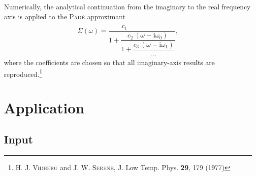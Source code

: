 \documentclass[twocolumn]{article}
\def\I{\mathrm i}
\let\vec\boldsymbol
\let\Sigma\varSigma
\let\vol\textbf
\let\name\textsc
\begin{document}
   Numerically,  the analytical  continuation  from the  imaginary  to the  real
   frequency axis is applied to the \name{Padé} approximant
   \begin{align*}
      \vec \Sigma(\omega) = \dfrac{c_1 \, \phantom{(\omega - \I \omega_0)}}
      {1 + \dfrac{c_2 \, (\omega - \I \omega_0)}
      {1 + \dfrac{c_3 \, (\omega - \I \omega_1)} \dots}},
   \end{align*}
   where  the coefficients  are chosen  so that  all imaginary-axis  results are
   reproduced.\footnote{H.  J. \name{Vidberg}  and J.  W. \name{Serene},  J. Low
   Temp. Phys. \vol{29}, 179 (1977)}

   \section{Application}

   \subsection{Input}
\end{document}
